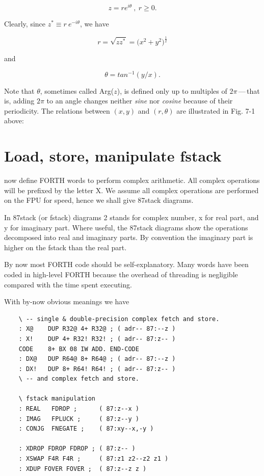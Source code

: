 \begin{equation}
  z = re^{i\theta}\ ,\ r \geq 0.
\end{equation}

Clearly, since $z^* \equiv r\ e^{-i\theta}$, we have

\begin{equation}
  r = \sqrt{zz^*} = \big(x^2 + y^2\big)^\frac{1}{2}
\end{equation}

and

\begin{equation}
  \theta = tan^{-1}(y/x).
\end{equation}

Note that $\theta$, sometimes called Arg($z$), is defined only up to multiples of $2\pi$\,---\,that is, adding $2\pi$ to an angle changes neither \textit{sine} nor \textit{cosine} because of their periodicity. The relations between $(x,y)$ and $(r,\theta)$ are illustrated in Fig. 7-1 above:

\section{Load, store, manipulate fstack}
 now define FORTH words to perform complex arithmetic. All complex operations will be prefixed by the letter X. We assume all complex operations are performed on the FPU for speed, hence we shall give 87stack diagrams.

In 87stack (or fstack) diagrams 2 stands for complex number, x for real part, and y for imaginary part. Where useful, the 87stack diagrams show the operations decomposed into real and imaginary parts. By convention the imaginary part is higher on the fstack than the real part.

By now most FORTH code should be self-explanatory. Many words have been coded in high-level FORTH because the overhead of threading is negligible compared with the time spent executing.

With by-now obvious meanings we have

\begin{lstlisting}
    \ -- single & double-precision complex fetch and store.
    : X@    DUP R32@ 4+ R32@ ; ( adr-- 87:--z )
    : X!    DUP 4+ R32! R32! ; ( adr-- 87:z-- )
    CODE    8+ BX 08 IW ADD. END-CODE
    : DX@   DUP R64@ 8+ R64@ ; ( adr-- 87:--z )
    : DX!   DUP 8+ R64! R64! ; ( adr-- 87:z-- )
    \ -- and complex fetch and store.

    \ fstack manipulation
    : REAL   FDROP ;      ( 87:z--x )
    : IMAG   FPLUCK ;     ( 87:z--y )
    : CONJG  FNEGATE ;    ( 87:xy--x,-y )

    : XDROP FDROP FDROP ; ( 87:z-- )
    : XSWAP F4R F4R ;     ( 87:z1 z2--z2 z1 )
    : XDUP FOVER FOVER ;  ( 87:z--z z )
\end{lstlisting}

